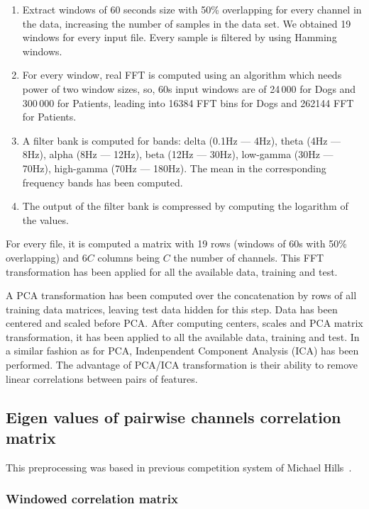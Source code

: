 \documentclass[a4paper,english,twoside]{article}
\begin{document}
\begin{enumerate}
\item
  Extract windows of 60 seconds size with 50\% overlapping for every
  channel in the data, increasing the number of samples in the data set.
  We obtained 19 windows for every input file. Every sample is filtered
  by using Hamming windows.
\item
  For every window, real FFT is computed using an algorithm which needs
  power of two window sizes, so, 60s input windows are of 24\,000 for Dogs
  and 300\,000 for Patients, leading into 16384 FFT bins for Dogs and
  262144 FFT for Patients.
\item A filter bank is computed for bands: delta (0.1Hz --- 4Hz), theta (4Hz ---
  8Hz), alpha (8Hz --- 12Hz), beta (12Hz --- 30Hz), low-gamma (30Hz --- 70Hz),
  high-gamma (70Hz --- 180Hz). The mean in the corresponding frequency bands has
  been computed.
\item
  The output of the filter bank is compressed by computing the logarithm
  of the values.
\end{enumerate}

For every file, it is computed a matrix with 19 rows (windows of 60s with 50\%
overlapping) and $6C$ columns being $C$ the number of channels. This FFT
transformation has been applied for all the available data, training and test.

A PCA transformation has been computed over the concatenation by rows of
all training data matrices, leaving test data hidden for this step. Data
has been centered and scaled before PCA. After computing centers, scales
and PCA matrix transformation, it has been applied to all the available
data, training and test. In a similar fashion as for PCA, Indenpendent
Component Analysis (ICA) has been performed. The advantage of PCA/ICA
transformation is their ability to remove linear correlations between
pairs of features.

\subsection{Eigen values of pairwise channels correlation
  matrix}\label{eigen-values-of-pairwise-channels-correlation-matrix}

This preprocessing was based in previous competition system of Michael Hills~\cite{michaelhills}.

\subsubsection{Windowed correlation
  matrix}\label{windowed-correlation-matrix}
\end{document}
